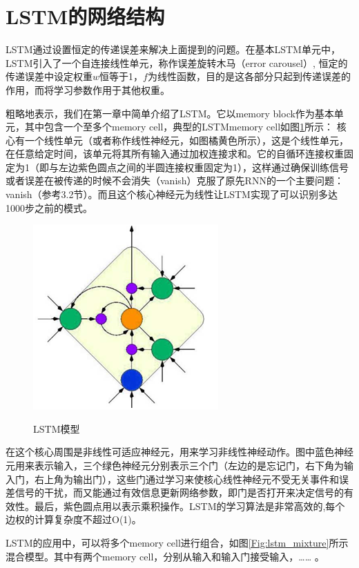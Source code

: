 \section{LSTM的网络结构}
LSTM通过设置恒定的传递误差来解决上面提到的问题。在基本LSTM单元中，LSTM引入了一个自连接线性单元，称作误差旋转木马（error carousel）, 恒定的传递误差中设定权重$w$恒等于1，$f$为线性函数，目的是这各部分只起到传递误差的作用，而将学习参数作用于其他权重。

粗略地表示，我们在第一章中简单介绍了LSTM。它以memory block作为基本单元，其中包含一个至多个memory cell，典型的LSTMmemory cell如图\ref{Fig:lstm_simple}所示：
核心有一个线性单元（或者称作线性神经元，如图橘黄色所示），这是个线性单元，在任意给定时间，该单元将其所有输入通过加权连接求和。它的自循环连接权重固定为1（即与左边紫色圆点之间的半圆连接权重固定为1），这样通过确保训练信号或者误差在被传递的时候不会消失（vanish）克服了原先RNN的一个主要问题：vanish（参考3.2节）。而且这个核心神经元为线性让LSTM实现了可以识别多达1000步之前的模式。


\begin{figure}[htb]
  \centering
  \includegraphics{Pictures/LSTM/lstm_simple.png}\\
  \caption{LSTM模型}\label{Fig:lstm_simple}
\end{figure}

在这个核心周围是非线性可适应神经元，用来学习非线性神经动作。图中蓝色神经元用来表示输入，三个绿色神经元分别表示三个门（左边的是忘记门，右下角为输入门，右上角为输出门），这些门通过学习来使核心线性神经元不受无关事件和误差信号的干扰，而又能通过有效信息更新网络参数，即门是否打开来决定信号的有效性。最后，紫色圆点用以表示乘积操作。LSTM的学习算法是非常高效的,每个边权的计算复杂度不超过O(1)。


LSTM的应用中，可以将多个memory cell进行组合，如图\ref{Fig:lstm_mixture}所示混合模型。其中有两个memory cell，分别从输入和输入门接受输入，……
。

